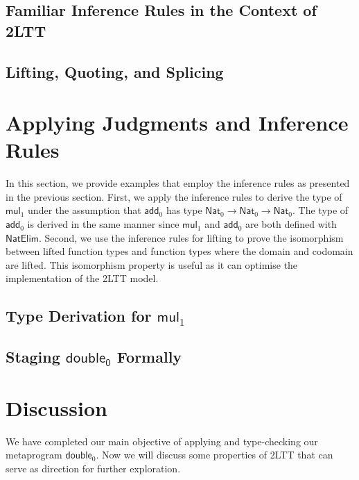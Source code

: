 \documentclass{article}
\begin{document}
\subsection{Familiar Inference Rules in the Context of 2LTT}





\subsection{Lifting, Quoting, and Splicing}




\section{Applying Judgments and Inference Rules}
In this section, we provide examples that employ the inference rules as presented in the previous section. First, we apply the inference rules to derive the type of $\mathsf{mul}_1$ under the assumption that $\mathsf{add}_0$ has type $\mathsf{Nat}_0\to\mathsf{Nat}_0\to\mathsf{Nat}_0$. The type of $\mathsf{add}_0$ is derived in the same manner since $\mathsf{mul}_1$ and $\mathsf{add}_0$ are both defined with $\mathsf{NatElim}$. Second, we use the inference rules for lifting to prove the isomorphism between lifted function types and function types where the domain and codomain are lifted. This isomorphism property is useful as it can optimise the implementation of the 2LTT model.


\subsection{Type Derivation for $\mathsf{mul}_1$}



\subsection{Staging $\mathsf{double_0}$ Formally}



\section{Discussion}
We have completed our main objective of applying and type-checking our metaprogram $\mathsf{double}_0$. Now we will discuss some properties of 2LTT that can serve as direction for further exploration.
\end{document}
